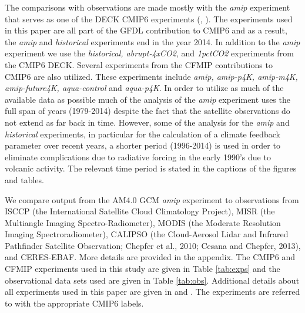 \documentclass[draft]{agujournal2019}
\begin{document}
The comparisons with observations are made mostly with the \textit{amip} experiment that serves as one of the DECK CMIP6 
experiments (\cite{Eyring_etal_2016},  \cite{Webb_etal_2017}).   The experiments used 
in this paper are all part of the GFDL contribution to CMIP6 and as a result, the \textit{amip} and \textit{historical}
experiments end in the year 2014.  In addition to the \textit{amip} experiment we use the \textit{historical, abrupt-4xCO2}, and \textit{1pctCO2}
experiments from the CMIP6 DECK.  Several experiments from the CFMIP contributions 
to CMIP6 are also utilized.  These experiments include \textit{amip, amip-p4K, amip-m4K, amip-future4K, aqua-control} and \textit{aqua-p4K}.  
In order to utilize as much of the available data as possible much of the analysis of the \textit{amip} experiment uses the 
full span of years (1979-2014) despite the fact that the satellite observations do not extend as far back in time.  However, 
some of the analysis for the \textit{amip} and \textit{historical} experiments, in particular for the calculation of a climate feedback parameter over recent years, a shorter period (1996-2014) is used in order to eliminate complications due to radiative forcing in the early 1990's due to volcanic activity.  The relevant time period is stated in the captions of the figures and tables.   

We compare output from the AM4.0 GCM \textit{amip} experiment to observations from ISCCP (the International Satellite Cloud Climatology Project), MISR (the Multiangle Imaging Spectro-Radiometer), MODIS (the Moderate Resolution Imaging Spectroradiometer), 
CALIPSO (the Cloud-Aerosol Lidar and Infrared Pathfinder Satellite Observation; 
Chepfer et al., 2010; Cesana and Chepfer, 2013), and CERES-EBAF.
More details are provided in the appendix.  The CMIP6 and CFMIP experiments used in this study are given in Table
\ref{tab:exps} and the observational data sets used are given in Table \ref{tab:obs}.  Additional details about all 
experiments used in this paper are given in \cite{Eyring_etal_2016} and \cite{Webb_etal_2017}.  The experiments are referred to with the
appropriate CMIP6 labels.   
\end{document}
